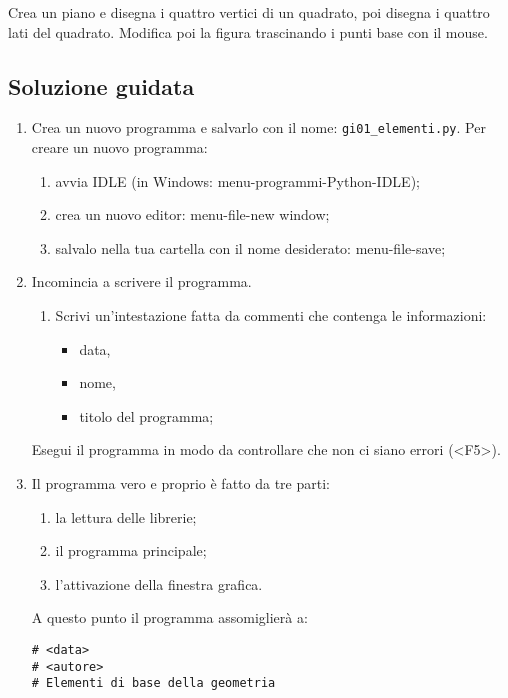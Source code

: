 Crea un piano e disegna i quattro vertici di un quadrato, poi
disegna i quattro lati del quadrato.
Modifica poi la figura trascinando i punti base con il mouse.

\subsection{Soluzione guidata}

\begin{enumerate} [noitemsep]
\item Crea un nuovo programma e salvarlo con il nome: 
\texttt{gi01\_elementi.py}.
Per creare un nuovo programma:

\begin{enumerate} [noitemsep]
\item avvia IDLE (in Windows: menu-programmi-Python-IDLE);
\item crea un nuovo editor: menu-file-new window;
\item salvalo nella tua cartella con il nome desiderato: menu-file-save;
\end{enumerate}

\item Incomincia a scrivere il programma.
\begin{enumerate} [noitemsep]
\item Scrivi un'intestazione fatta da commenti che contenga le informazioni:

\begin{itemize} [noitemsep]
\item data,
\item nome,
\item titolo del programma;
\end{itemize}
\end{enumerate}

Esegui il programma in modo da controllare che non ci siano errori 
(\textless{}F5\textgreater{}).
\item Il programma vero e proprio è fatto da tre parti:

\begin{enumerate} [noitemsep]
\item la lettura delle librerie;
\item il programma principale;
\item l'attivazione della finestra grafica.
\end{enumerate}

A questo punto il programma assomiglierà a:

\begin{lstlisting}
# <data>
# <autore>
# Elementi di base della geometria


\end{lstlisting}
\end{enumerate}
